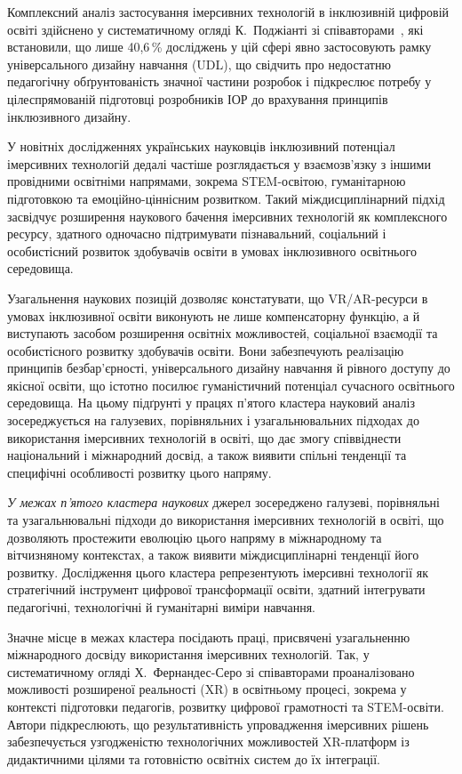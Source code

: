 Комплексний аналіз застосування імерсивних технологій в інклюзивній цифровій освіті здійснено у систематичному огляді К.~Поджіанті зі співавторами~\cite{Poggianti2025Inclusive}, які встановили, що лише 40{,}6\,\% досліджень у цій сфері явно застосовують рамку універсального дизайну навчання (UDL), що свідчить про недостатню педагогічну обґрунтованість значної частини розробок і підкреслює потребу у цілеспрямованій підготовці розробників ІОР до врахування принципів інклюзивного дизайну.

У новітніх дослідженнях українських науковців інклюзивний потенціал імерсивних технологій дедалі частіше розглядається у взаємозв'язку з іншими провідними освітніми напрямами, зокрема STEM-освітою, гуманітарною підготовкою та емоційно-ціннісним розвитком. Такий міждисциплінарний підхід засвідчує розширення наукового бачення імерсивних технологій як комплексного ресурсу, здатного одночасно підтримувати пізнавальний, соціальний і особистісний розвиток здобувачів освіти в умовах інклюзивного освітнього середовища.

Узагальнення наукових позицій дозволяє констатувати, що VR/AR-ресурси в умовах інклюзивної освіти виконують не лише компенсаторну функцію, а й виступають засобом розширення освітніх можливостей, соціальної взаємодії та особистісного розвитку здобувачів освіти. Вони забезпечують реалізацію принципів безбар'єрності, універсального дизайну навчання й рівного доступу до якісної освіти, що істотно посилює гуманістичний потенціал сучасного освітнього середовища. На цьому підґрунті у працях п'ятого кластера науковий аналіз зосереджується на галузевих, порівняльних і узагальнювальних підходах до використання імерсивних технологій в освіті, що дає змогу співвіднести національний і міжнародний досвід, а також виявити спільні тенденції та специфічні особливості розвитку цього напряму.


\emph{У межах п'ятого кластера наукових} джерел зосереджено галузеві, порівняльні та узагальнювальні підходи до використання імерсивних технологій в освіті, що дозволяють простежити еволюцію цього напряму в міжнародному та вітчизняному контекстах, а також виявити міждисциплінарні тенденції його розвитку. Дослідження цього кластера репрезентують імерсивні технології як стратегічний інструмент цифрової трансформації освіти, здатний інтегрувати педагогічні, технологічні й гуманітарні виміри навчання.

Значне місце в межах кластера посідають праці, присвячені узагальненню міжнародного досвіду використання імерсивних технологій. Так, у систематичному огляді Х.~Фернандес-Серо зі співавторами \cite{Malytska2022EU} проаналізовано можливості розширеної реальності (XR) в освітньому процесі, зокрема у контексті підготовки педагогів, розвитку цифрової грамотності та STEM-освіти. Автори підкреслюють, що результативність упровадження імерсивних рішень забезпечується узгодженістю технологічних можливостей XR-платформ із дидактичними цілями та готовністю освітніх систем до їх інтеграції.

